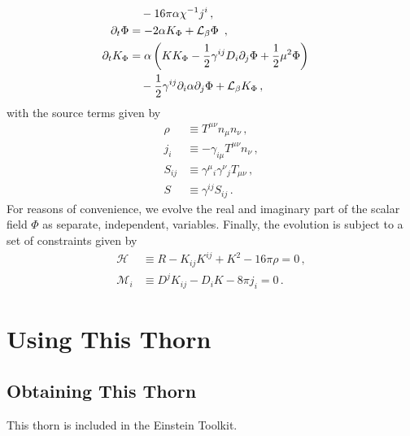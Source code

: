\begin{subequations}
\begin{align}
                    \notag \\
    & \quad - 16 \pi \alpha \chi^{-1} j^i \label{eq:tilde-Gamma-evol} \,, \\
%
  \p_{t} \Phi & = - 2 \alpha K_\Phi + \Lie_{\beta} \Phi\
                \,, \label{eq:dtPhi-BSSN} \\
%
  \p_{t} K_\Phi &  = \alpha \left( K K_{\Phi} - \frac{1}{2} \gamma^{ij} D_i \partial_j \Phi
                  + \frac{1}{2} \mu^2 \Phi \right) \nonumber \\
                 & \quad - \frac{1}{2} \gamma^{ij} \partial_i \alpha \partial_j \Phi
                       + \Lie_{\beta} K_\Phi \,, \label{eq:dtKphi-BSSN}
  \end{align}
\end{subequations}
%
%
with the source terms given by
%
\begin{equation}
  \label{eq:source}
   \begin{aligned}
  \rho & \equiv T^{\mu \nu}n_{\mu}n_{\nu} \,,\\
  j_i  &\equiv -\gamma_{i\mu} T^{\mu \nu}n_{\nu} \,, \\
  S_{ij} &\equiv \gamma^{\mu}{}_i \gamma^{\nu}{}_j T_{\mu \nu} \,, \\
  S     & \equiv \gamma^{ij}S_{ij} \,.
   \end{aligned}
\end{equation}
For reasons of convenience, we evolve the real and imaginary part of the scalar field $\Phi$ as separate, independent, variables.
Finally, the evolution is subject to a set of constraints given by
%
\begin{align}
\label{eq:Hamiltonian}
\mathcal{H} & \equiv R - K_{ij} K^{ij} + K^2 - 16 \pi \rho
       = 0\,,\\
\label{eq:momentumConstraint}
\mathcal{M}_{i} & \equiv D^{j} K_{ij} - D_{i} K 
        - 8\pi j_i
       = 0 \,.
\end{align}


\section{Using This Thorn}

\subsection{Obtaining This Thorn}

This thorn is included in the Einstein Toolkit.

